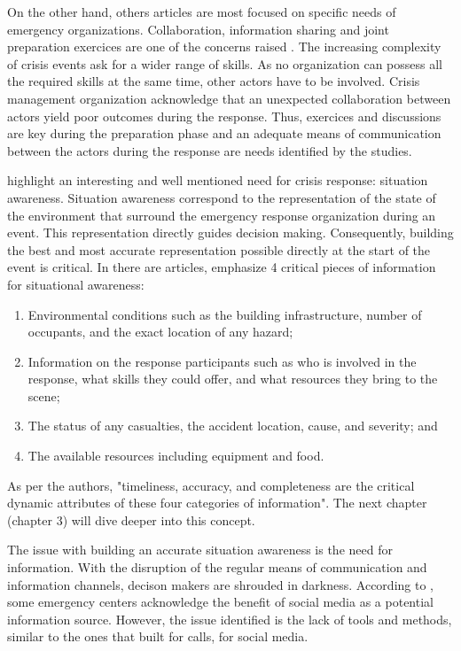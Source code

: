 On the other hand, others articles are most focused on specific needs of emergency organizations.
Collaboration, information sharing and joint preparation exercices are one of the concerns raised \parencite{berlinWhyCollaborationMinimised2011a,parkerSurfaceWaterFlood2011a}.
The increasing complexity of crisis events ask for a wider range of skills.
As no organization can possess all the required skills at the same time, other actors have to be involved.
Crisis management organization acknowledge that an unexpected collaboration between actors yield poor outcomes during the response.
Thus, exercices and discussions are key during the preparation phase and an adequate means of communication between the actors during the response are needs identified by the studies.

\textcite{yangDesignPrinciplesIntegrated2012a} highlight an interesting and well mentioned need for crisis response: situation awareness.
Situation awareness correspond to the representation of the state of the environment that surround the emergency response organization during an event.
This representation directly guides decision making.
Consequently, building the best and most accurate representation possible directly at the start of the event is critical.
In there are articles, \citeauthor{yangDesignPrinciplesIntegrated2012a} emphasize 4 critical pieces of information for situational awareness:

\begin{enumerate}
    \item Environmental conditions such as the building infrastructure, number of occupants, and the exact location of any hazard;
    \item Information on the response participants such as who is involved in the response, what skills they could offer, and what resources they bring to the scene;
    \item The status of any casualties, the accident location, cause, and severity; and
    \item The available resources including equipment and food.
\end{enumerate}

As per the authors, "timeliness, accuracy, and completeness are the critical dynamic attributes of these four categories of information".
The next chapter (chapter 3) will dive deeper into this concept.

The issue with building an accurate situation awareness is the need for information.
With the disruption of the regular means of communication and information channels, decison makers are shrouded in darkness.
According to \textcite{tapiaTrustworthyTweetDeeper2013a,cobbDesigningDelugeUnderstanding2014a}, some emergency centers acknowledge the benefit of social media as a potential information source.
However, the issue identified is the lack of tools and methods, similar to the ones that built for calls, for social media.

